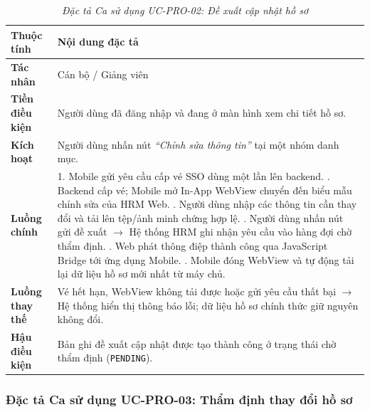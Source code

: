 \begin{table}[H]
\centering
\renewcommand{\arraystretch}{1.25}
\begin{tabularx}{\textwidth}{|p{3.2cm}|X|}
\hline
\textbf{Thuộc tính} & \textbf{Nội dung đặc tả} \\
\hline
\textbf{Tác nhân} & Cán bộ / Giảng viên \\
\hline
\textbf{Tiền điều kiện} & Người dùng đã đăng nhập và đang ở màn hình xem chi tiết hồ sơ. \\
\hline
\textbf{Kích hoạt} & Người dùng nhấn nút \textit{``Chỉnh sửa thông tin''} tại một nhóm danh mục. \\
\hline
\textbf{Luồng chính} & 
1. Mobile gửi yêu cầu cấp vé SSO dùng một lần lên backend. \newline
2. Backend cấp vé; Mobile mở In-App WebView chuyển đến biểu mẫu chỉnh sửa của HRM Web. \newline
3. Người dùng nhập các thông tin cần thay đổi và tải lên tệp/ảnh minh chứng hợp lệ. \newline
4. Người dùng nhấn nút gửi đề xuất $\rightarrow$ Hệ thống HRM ghi nhận yêu cầu vào hàng đợi chờ thẩm định. \newline
5. Web phát thông điệp thành công qua JavaScript Bridge tới ứng dụng Mobile. \newline
6. Mobile đóng WebView và tự động tải lại dữ liệu hồ sơ mới nhất từ máy chủ. \\
\hline
\textbf{Luồng thay thế} & Vé hết hạn, WebView không tải được hoặc gửi yêu cầu thất bại $\rightarrow$ Hệ thống hiển thị thông báo lỗi; dữ liệu hồ sơ chính thức giữ nguyên không đổi. \\
\hline
\textbf{Hậu điều kiện} & Bản ghi đề xuất cập nhật được tạo thành công ở trạng thái chờ thẩm định (\texttt{PENDING}). \\
\hline
\end{tabularx}
\caption{\textit{Đặc tả Ca sử dụng UC-PRO-02: Đề xuất cập nhật hồ sơ}}
\label{tab:uc_pro_02}
\end{table}

\subsubsection{Đặc tả Ca sử dụng UC-PRO-03: Thẩm định thay đổi hồ sơ}

